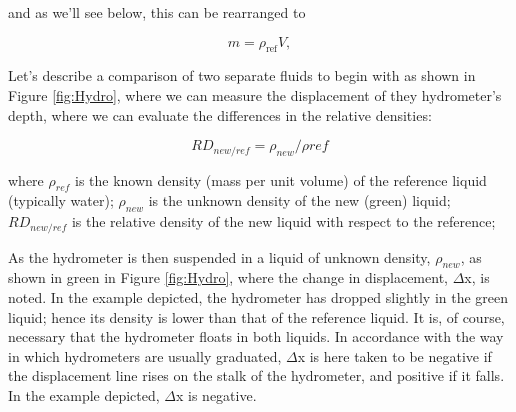 \documentclass{tufte-handout}
\begin{document}
and as we'll see below, this can be rearranged to 

\begin{equation}\label{eq:archmidies}
m = \rho_\mathrm{ref} V,
\end{equation}

Let's describe a comparison of two separate fluids to begin with as shown in Figure \ref{fig:Hydro}, where we can measure the displacement of they hydrometer's depth, where we can evaluate the differences in the relative densities: 

\begin{equation}
RD_{new/ref} = \rho_{new}/\rho{ref}
\end{equation}

\noindent where $\rho_{ref}$ is the known density (mass per unit volume) of the reference liquid (typically water);
$\rho_{new}$ is the unknown density of the new (green) liquid;
$RD_{new/ref}$ is the relative density of the new liquid with respect to the reference;

As the hydrometer is then suspended in a liquid of unknown density, $\rho_{new}$, as shown in green in Figure \ref{fig:Hydro}, where the change in displacement, $\Delta$x, is noted. In the example depicted, the hydrometer has dropped slightly in the green liquid; hence its density is lower than that of the reference liquid. It is, of course, necessary that the hydrometer floats in both liquids. In accordance with the way in which hydrometers are usually graduated, $\Delta$x is here taken to be negative if the displacement line rises on the stalk of the hydrometer, and positive if it falls. In the example depicted, $\Delta$x is negative.
\end{document}
